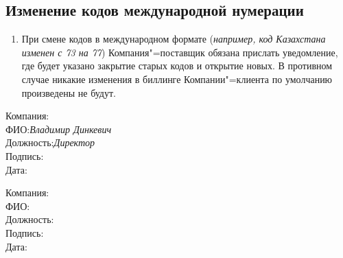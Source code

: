 \begin{Form}
  \section{Изменение кодов международной нумерации}
    \begin{enumerate}[label=\thesection.\arabic*.]
     \item При смене кодов в международном формате (\textit{например, код Казахстана изменен с 73 на 77})
           Компания"=поставщик обязана прислать уведомление, где будет указано закрытие старых кодов и открытие новых.
           В противном случае никакие изменения в биллинге Компании"=клиента по умолчанию произведены не будут.
    \end{enumerate}

\thispagestyle{appendix-nofooter}

\noindent
\dotfill
\noindent
\vfill
\noindent
\parbox[t]{0.5\linewidth}{
Компания:\hfill\textbf{\ipxpname}\hspace*{0.5cm}\\
ФИО:\hfill\textit{Владимир Динкевич}\hspace*{0.5cm}\\
Должность:\hfill\textit{Директор}\hspace*{0.5cm}\\
Подпись: \hrulefill\hspace*{0.5cm}\\
Дата: \hrulefill\hspace*{0.5cm}\\
}
\hfill
\parbox[t]{0.5\linewidth}{
\hspace*{0.5cm}Компания: \TextField[name=clntname,charsize=10pt,width=62mm,height=1em,align=2,borderwidth=0,bordercolor={1 1 1}]{}\\
\hspace*{0.5cm}ФИО: \TextField[bordersep=1,name=clntattorneyprintname,charsize=10pt,width=69mm,height=1em,align=2,borderwidth=0,bordercolor={1 1 1}]{}\\
\hspace*{0.5cm}Должность: \TextField[name=clntattorneyposition,charsize=10pt,width=60mm,height=1em,align=2,borderwidth=0,bordercolor={1 1 1}]{}\\
\hspace*{0.5cm}Подпись: \hrulefill\\
\hspace*{0.5cm}Дата: \hrulefill\\
}



\end{Form}

